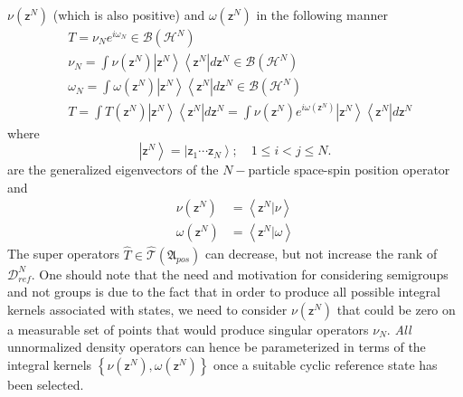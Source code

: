 \documentclass[aps,preprint]{revtex4}%
\begin{document}
$\nu\left(  \mathsf{z}^{N}\right)  $ (which is also positive) and
$\omega\left(  \mathsf{z}^{N}\right)  $ in the following manner
\begin{align}
&  T=\nu_{N}e^{i\omega_{N}}\in\mathcal{B}\left(  \mathcal{H}^{N}\right)
\nonumber\\
&  \nu_{N}=\int\nu\left(  \mathsf{z}^{N}\right)  \left\vert \mathsf{z}%
^{N}\right\rangle \left\langle \mathsf{z}^{N}\right\vert d\mathsf{z}^{N}%
\in\mathcal{B}\left(  \mathcal{H}^{N}\right) \nonumber\\
&  \omega_{N}=\int\omega\left(  \mathsf{z}^{N}\right)  \left\vert
\mathsf{z}^{N}\right\rangle \left\langle \mathsf{z}^{N}\right\vert
d\mathsf{z}^{N}\in\mathcal{B}\left(  \mathcal{H}^{N}\right) \nonumber\\
&  T=\int T\left(  \mathsf{z}^{N}\right)  \left\vert \mathsf{z}^{N}%
\right\rangle \left\langle \mathsf{z}^{N}\right\vert d\mathsf{z}^{N}=\int
\nu\left(  \mathsf{z}^{N}\right)  e^{i\omega\left(  \mathsf{z}^{N}\right)
}\left\vert \mathsf{z}^{N}\right\rangle \left\langle \mathsf{z}^{N}\right\vert
d\mathsf{z}^{N} \label{TDiag}%
\end{align}
where
\begin{equation}
\left\vert \mathsf{z}^{N}\right\rangle =\left\vert \mathsf{z}_{1}%
\cdots\mathsf{z}_{N}\right\rangle ;\quad1\leq i<j\leq N.
\end{equation}
are the generalized eigenvectors of the $N-$particle space-spin position
operator and
\begin{align}
\nu\left(  \mathsf{z}^{N}\right)   &  =\left\langle \mathsf{z}^{N}%
|\nu\right\rangle \nonumber\\
\omega\left(  \mathsf{z}^{N}\right)   &  =\left\langle \mathsf{z}^{N}%
|\omega\right\rangle
\end{align}
The super operators $\hat{T}\in\mathcal{\hat{T}}\left(  \mathfrak{A}%
_{pos}\right)  $ can decrease, but not increase the rank of $\mathcal{D}%
_{ref}^{N}$. One should note that the need and motivation for considering
semigroups and not groups is due to the fact that in order to produce all
possible integral kernels associated with states, we need to consider
$\nu\left(  \mathsf{z}^{N}\right)  $ that could be zero on a measurable set of
points that would produce singular operators $\nu_{N}$. \emph{All}
unnormalized density operators can hence be parameterized in terms of the
integral kernels $\left\{  \nu\left(  \mathsf{z}^{N}\right)  ,\omega\left(
\mathsf{z}^{N}\right)  \right\}  $ once a suitable cyclic reference state
\cite{weiner2002} has been selected.
\end{document}
